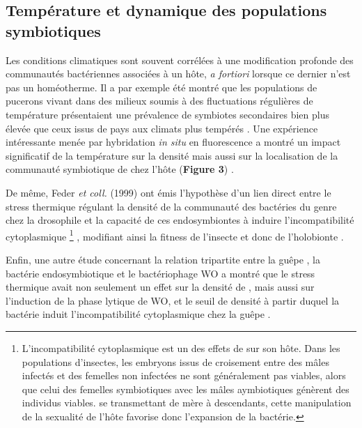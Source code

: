 \subsection{Température et dynamique des populations symbiotiques}

Les conditions climatiques sont souvent corrélées à une modification profonde des communautés bactériennes associées à un hôte, \textit{a fortiori} lorsque ce dernier n'est pas un homéotherme.
Il a par exemple été montré que les populations de pucerons vivant dans des milieux soumis à des fluctuations régulières de température présentaient une prévalence de symbiotes secondaires bien plus élevée que ceux issus de pays aux climats plus tempérés \cite{harmon2009}.
Une expérience intéressante menée par hybridation \textit{in situ} en fluorescence a montré un impact significatif de la température sur la densité mais aussi sur la localisation de la communauté symbiotique de  chez l'hôte  (\textbf{Figure 3}) \cite{brumin2011}.

De même, Feder \textit{et coll.} (1999) ont émis l'hypothèse d'un lien direct entre le stress thermique régulant la densité de la communauté des bactéries du genre  chez la drosophile et la capacité de ces endosymbiontes à induire l'incompatibilité cytoplasmique%
\footnote{L'incompatibilité cytoplasmique est un des effets de  sur son hôte. Dans les populations d'insectes, les embryons issus de croisement entre des mâles infectés et des femelles non infectées ne sont généralement pas viables, alors que celui des femelles symbiotiques avec les mâles aymbiotiques génèrent des individus viables.  se transmettant de mère à descendants, cette manipulation de la sexualité de l'hôte favorise donc l'expansion de la bactérie.}%
, modifiant ainsi la fitness de l'insecte et donc de l'holobionte \cite{feder1999}. 

Enfin, une autre étude concernant la relation tripartite entre la guêpe , la bactérie endosymbiotique  et le bactériophage WO a montré que le stress thermique avait non seulement un effet sur la densité de , mais aussi sur l'induction de la phase lytique de WO, et le seuil de densité à partir duquel la bactérie  induit l'incompatibilité cytoplasmique chez la guêpe \cite{bordenstein2011}.
